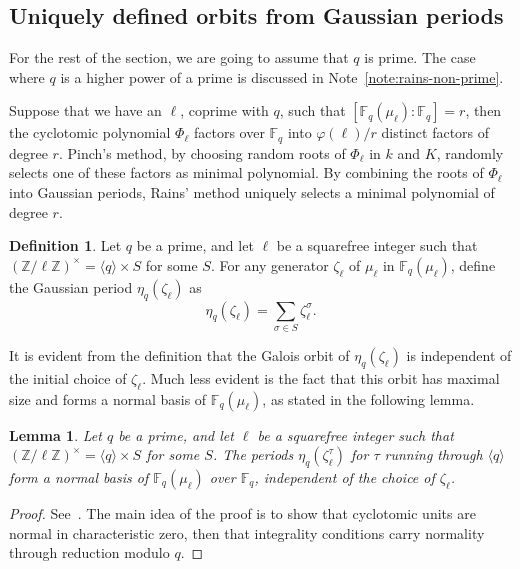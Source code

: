 \documentclass{mcom-l}
\theoremstyle{plain}
\newtheorem{lemma}[theorem]{Lemma}
\theoremstyle{definition}
\newtheorem{definition}[theorem]{Definition}
\newcommand{\Z}{\ensuremath{\mathbb{Z}}}
\newcommand{\F}{\ensuremath{\mathbb{F}}}
\newcommand{\euler}{\ensuremath{\varphi}}
\begin{document}
\subsection{Uniquely defined orbits from Gaussian periods}

For the rest of the section, we are going to assume that $q$ is
prime. The case where $q$ is a higher power of a prime is discussed in
Note~\ref{note:rains-non-prime}.

Suppose that we have an $\ell$, coprime with $q$, such that
$[\F_q(\mu_\ell):\F_q]=r$, then the cyclotomic polynomial $\Phi_\ell$
factors over $\F_q$ into $\euler(\ell)/r$ distinct factors of degree
$r$. Pinch's method, by choosing random roots of $\Phi_\ell$ in $k$
and $K$, randomly selects one of these factors as minimal polynomial.
By combining the roots of $\Phi_\ell$ into Gaussian periods, Rains'
method uniquely selects a minimal polynomial of degree $r$.

\begin{definition}
  Let $q$ be a prime, and let $\ell$ be a squarefree integer such that
  $(\Z/\ell\Z)^\times = \langle q\rangle \times S$ for some $S$.  For any
  generator $\zeta_\ell$ of $\mu_\ell$ in $\F_q(\mu_\ell)$, define the
  Gaussian period $\eta_q(\zeta_\ell)$ as
  \begin{equation}
    \eta_q(\zeta_\ell) = \sum_{\sigma\in S}{\zeta_\ell^{\sigma}}.
  \end{equation}
\end{definition}

It is evident from the definition that the Galois orbit of
$\eta_q(\zeta_\ell)$ is independent of the initial choice of
$\zeta_\ell$. Much less evident is the fact that this orbit has
maximal size and forms a normal basis of $\F_q(\mu_\ell)$, as stated
in the following lemma.

\begin{lemma}
  \label{th:gaussian}
  Let $q$ be a prime, and let $\ell$ be a squarefree integer such that
  $(\Z/\ell\Z)^\times = \langle q\rangle \times S$ for some $S$.  The
  periods $\eta_q(\zeta_\ell^\tau)$ for $\tau$ running through
  $\langle q\rangle$ form a normal basis of $\F_q(\mu_\ell)$ over
  $\F_q$, independent of the choice of $\zeta_\ell$.
\end{lemma}
\begin{proof}
  See~\cite[Main Theorem]{feisel1999normal}.
  The main idea of the proof is to show that cyclotomic units are
  normal in characteristic zero, then that integrality conditions
  carry normality through reduction modulo $q$.
\end{proof}
\end{document}
